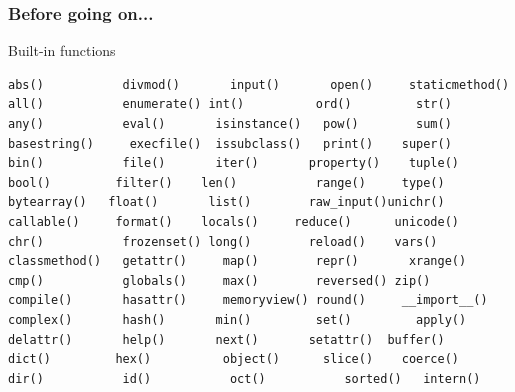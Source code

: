 \documentclass[colorlinks]{beamer}
\begin{document}
\begin{frame}[fragile]\frametitle{Before going on...}
\begin{block}{Built-in functions}
\tiny
\begin{verbatim}
abs()	        divmod()	   input()	     open()	    staticmethod()
all()	        enumerate()	int()	       ord()	     str()
any()	        eval()	     isinstance()	pow()	     sum()
basestring()	 execfile()	 issubclass()	print()	   super()
bin()	        file()	     iter()	      property()	tuple()
bool()	       filter()	   len()	       range()	   type()
bytearray()	  float()	    list()	      raw_input()unichr()
callable()	   format()	   locals()	    reduce()	  unicode()
chr()	        frozenset()	long()	      reload()	  vars()
classmethod()	getattr()	  map()	       repr()	    xrange()
cmp()	        globals()	  max()	       reversed() zip()
compile()	    hasattr()	  memoryview() round()	   __import__()
complex()	    hash()	     min()	       set()	     apply()
delattr()	    help()	     next()	      setattr()	 buffer()
dict()	       hex()	      object()	    slice()	   coerce()
dir()	        id()	       oct()	       sorted()	  intern()
\end{verbatim}

\end{block}

\end{frame}
\end{document}
